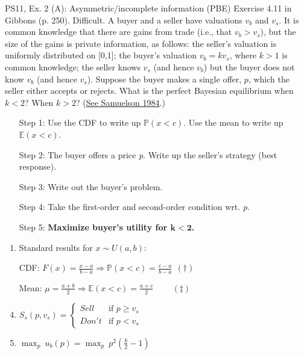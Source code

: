 \begin{frame}{PS11, Ex. 2 (A): Asymmetric/incomplete information (PBE)}
    Exercise 4.11 in Gibbons (p. 250). Difficult. A buyer and a seller have valuations $v_b$ and $v_s$. It is common knowledge that there are gains from trade (i.e., that $v_b > v_s$), but the size of the gains is private information, as follows: the seller’s valuation is uniformly distributed on [0,1]; the buyer’s valuation $v_b = kv_s$, where $k > 1$ is common knowledge; the seller knows $v_s$ (and hence $v_b$) but the buyer does not know $v_b$ (and hence $v_s$). Suppose the buyer makes a single offer, $p$, which the seller either accepts or rejects. What is the perfect Bayesian equilibrium when $k < 2$? When $k > 2$? (\href{https://www.jstor.org/stable/1911195}{See Samuelson 1984}.) \vspace{-8pt}
    \begin{multicols}{2}
      \begin{itemize}
        \item[Step 1:] Use the CDF to write up $\mathbb{P}(x<c)$. Use the mean to write up $\mathbb{E}(x<c)$.
        \item[Step 2:] The buyer offers a price \textit{p}. Write up the seller's strategy (best response).
        \item[Step 3:] Write out the buyer's problem.
        \item[Step 4:] Take the first-order and second-order condition wrt. \textit{p}.
        \item[Step 5:] \textbf{Maximize buyer's utility for $\bm{k<2}$.}
      \end{itemize}
      \vfill\null\columnbreak
      \begin{enumerate}
        \item Standard results for $x\sim U(a, b):$
        \item[CDF:] $F(x)=\frac{x-a}{b-a}\Rightarrow\mathbb{P}(x<c)=\frac{c-a}{b-a}\ \ (\dagger)$
        \item[Mean:] $\mu=\frac{a+b}{2}\Rightarrow\mathbb{E}(x<c)=\frac{a+c}{2}\quad\quad\ (\ddagger)$
        \item $S_s(p,v_s)=\left\{\begin{array}{ll}
          Sell  & \text{if }p\geq v_s \\
          Don't & \text{if }p < v_s
        \end{array}\right.$
        \item $\displaystyle{\max_p}\ u_b(p)=\displaystyle{\max_p}\ p^2\left(\frac{k}{2}-1\right)$

\end{enumerate}
\end{multicols}
\end{frame}
